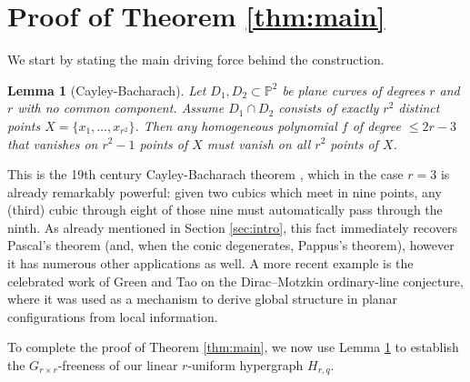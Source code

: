 \documentclass[11pt]{article}
\newtheorem{lemma}[theorem]{Lemma}
\theoremstyle{definition}
\theoremstyle{remark}
\newcommand{\PP}{\mathbb{P}}
\begin{document}
\section{Proof of Theorem \ref{thm:main}} \label{sec:CB}

We start by stating the main driving force behind the construction. 

\begin{lemma}[Cayley-Bacharach]\label{cor:planeCB}
Let $D_1,D_2\subset \PP^2$ be plane curves of degrees $r$ and $r$ with no common component.
Assume $D_1\cap D_2$ consists of exactly $r^2$ distinct points $X=\{x_1,\dots,x_{r^2}\}$.
Then any homogeneous polynomial $f$ of degree $\le 2r-3$ that vanishes on $r^2-1$ points of $X$
must vanish on all $r^2$ points of $X$.
\end{lemma}

This is the 19th century Cayley-Bacharach theorem \cite{Eisenbud}, which in the case $r=3$ is already remarkably powerful: given two cubics which meet in nine points, any (third) cubic through eight of those nine must automatically pass through the ninth. As already mentioned in Section \ref{sec:intro}, this fact immediately recovers Pascal's theorem (and, when the conic degenerates, Pappus's theorem), however it has numerous other applications as well. A more recent example is the celebrated work of Green and Tao \cite{GreenTao} on the Dirac–Motzkin ordinary-line conjecture, where it was used as a mechanism to derive global structure in planar configurations from local information.

To complete the proof of Theorem \ref{thm:main}, we now use Lemma \ref{cor:planeCB} to establish the $G_{r \times r}$-freeness of our linear $r$-uniform hypergraph $H_{r,q}$. 
\end{document}
